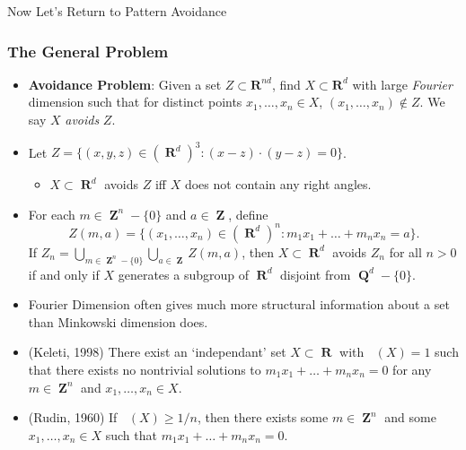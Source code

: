 \documentclass[usenames,dvipsnames,handout]{beamer}
\DeclareMathOperator{\RR}{\textbf{R}}
\DeclareMathOperator{\QQ}{\textbf{Q}}
\DeclareMathOperator{\ZZ}{\textbf{Z}}
\DeclareMathOperator{\fordim}{\text{dim}_{\textbf{F}}}
\DeclareMathOperator{\hausdim}{\text{dim}_{\textbf{H}}}
\begin{document}
\begin{frame}
    Now Let's Return to Pattern Avoidance
\end{frame}




\begin{frame}
    \frametitle{The General Problem}

    \begin{itemize}
        \item {\bf Avoidance Problem}: Given a set $Z \subset \mathbf{R}^{nd}$, find $X \subset \mathbf{R}^d$ with large \emph{Fourier} dimension such that for distinct points $x_1, \dots, x_n \in X$, $(x_1, \dots, x_n) \not \in Z$. We say $X$ \emph{avoids} $Z$.

        \pause
        \item Let $Z = \{ (x,y,z) \in (\RR^d)^3: (x - z) \cdot (y - z) = 0 \}$.
        \begin{itemize}
            \item $X \subset \RR^d$ avoids $Z$ iff $X$ does not contain any right angles.
        \end{itemize}

        \pause
        \item For each $m \in \ZZ^n - \{ 0 \}$ and $a \in \ZZ$, define
        \[ Z(m,a) = \{  (x_1, \dots, x_n) \in (\RR^d)^n : m_1x_1 + \dots + m_nx_n = a \}. \]
        \pause
        If $Z_n = \bigcup_{m \in \ZZ^n - \{ 0 \}} \bigcup_{a \in \ZZ} Z(m,a)$, then $X \subset \RR^d$ avoids $Z_n$ for all $n > 0$ if and only if $X$ generates a subgroup of $\RR^d$ disjoint from $\QQ^d - \{ 0 \}$.

    \end{itemize}
\end{frame}





\begin{frame}
    \begin{itemize}
        \pause
        \item Fourier Dimension often gives much more structural information about a set than Minkowski dimension does.

        \pause
        \item (Keleti, 1998) There exist an `independant' set $X \subset \RR$ with $\hausdim(X) = 1$ such that there exists no nontrivial solutions to $m_1x_1 + \dots + m_nx_n = 0$ for any $m \in \ZZ^n$ and $x_1, \dots, x_n \in X$.

        \pause
        \item (Rudin, 1960) If $\fordim(X) \geq 1/n$, then there exists some $m \in \ZZ^n$ and some $x_1, \dots, x_n \in X$ such that $m_1 x_1 + \dots + m_n x_n = 0$.
    \end{itemize}
\end{frame}
\end{document}
